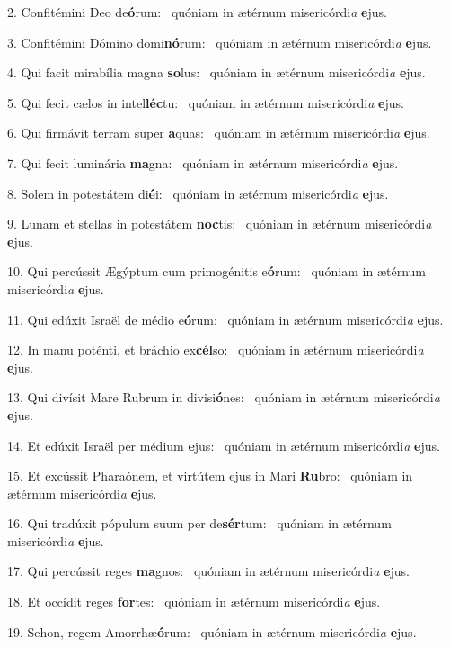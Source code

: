 2. Confitémini Deo de\textbf{ó}rum: \ast\  quóniam in ætérnum misericórdi\textit{a} \textbf{e}jus.\

3. Confitémini Dómino domi\textbf{nó}rum: \ast\  quóniam in ætérnum misericórdi\textit{a} \textbf{e}jus.\

4. Qui facit mirabília magna \textbf{so}lus: \ast\  quóniam in ætérnum misericórdi\textit{a} \textbf{e}jus.\

5. Qui fecit cælos in intel\textbf{léc}tu: \ast\  quóniam in ætérnum misericórdi\textit{a} \textbf{e}jus.\

6. Qui firmávit terram super \textbf{a}quas: \ast\  quóniam in ætérnum misericórdi\textit{a} \textbf{e}jus.\

7. Qui fecit luminária \textbf{ma}gna: \ast\  quóniam in ætérnum misericórdi\textit{a} \textbf{e}jus.\

8. Solem in potestátem di\textbf{é}i: \ast\  quóniam in ætérnum misericórdi\textit{a} \textbf{e}jus.\

9. Lunam et stellas in potestátem \textbf{noc}tis: \ast\  quóniam in ætérnum misericórdi\textit{a} \textbf{e}jus.\

10. Qui percússit Ægýptum cum primogénitis e\textbf{ó}rum: \ast\  quóniam in ætérnum misericórdi\textit{a} \textbf{e}jus.\

11. Qui edúxit Israël de médio e\textbf{ó}rum: \ast\  quóniam in ætérnum misericórdi\textit{a} \textbf{e}jus.\

12. In manu poténti, et bráchio ex\textbf{cél}so: \ast\  quóniam in ætérnum misericórdi\textit{a} \textbf{e}jus.\

13. Qui divísit Mare Rubrum in divisi\textbf{ó}nes: \ast\  quóniam in ætérnum misericórdi\textit{a} \textbf{e}jus.\

14. Et edúxit Israël per médium \textbf{e}jus: \ast\  quóniam in ætérnum misericórdi\textit{a} \textbf{e}jus.\

15. Et excússit Pharaónem, et virtútem ejus in Mari \textbf{Ru}bro: \ast\  quóniam in ætérnum misericórdi\textit{a} \textbf{e}jus.\

16. Qui tradúxit pópulum suum per de\textbf{sér}tum: \ast\  quóniam in ætérnum misericórdi\textit{a} \textbf{e}jus.\

17. Qui percússit reges \textbf{ma}gnos: \ast\  quóniam in ætérnum misericórdi\textit{a} \textbf{e}jus.\

18. Et occídit reges \textbf{for}tes: \ast\  quóniam in ætérnum misericórdi\textit{a} \textbf{e}jus.\

19. Sehon, regem Amorrhæ\textbf{ó}rum: \ast\  quóniam in ætérnum misericórdi\textit{a} \textbf{e}jus.\

